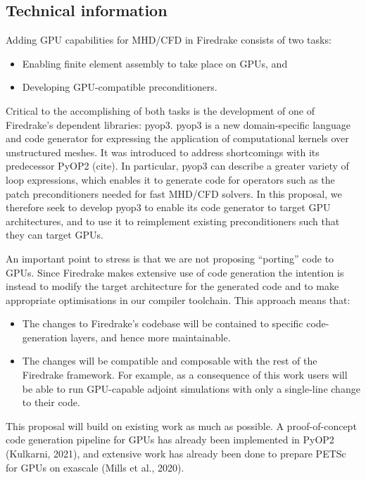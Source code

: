 \documentclass[a4paper,11pt]{article}
\begin{document}
\subsection{Technical information}
Adding GPU capabilities for MHD/CFD in Firedrake consists of two tasks: 
\begin{itemize}
	\item Enabling finite element assembly to take place on GPUs, and 
	\item Developing GPU-compatible preconditioners.
\end{itemize}
Critical to the accomplishing of both tasks is the development of one of Firedrake’s dependent libraries: pyop3. pyop3 is a new domain-specific language and code generator for expressing the application of computational kernels over unstructured meshes.
It was introduced to address shortcomings with its predecessor PyOP2 (cite).
In particular, pyop3 can describe a greater variety of loop expressions, which enables it to generate code for operators such as the patch preconditioners needed for fast MHD/CFD solvers.
In this proposal, we therefore seek to develop pyop3 to enable its code generator to target GPU architectures, and to use it to reimplement existing preconditioners such that they can target GPUs. 

An important point to stress is that we are not proposing ``porting'' code to GPUs.
Since Firedrake makes extensive use of code generation the intention is instead to modify the target architecture for the generated code and to make appropriate optimisations in our compiler toolchain.
This approach means that: 
\begin{itemize}
	\item The changes to Firedrake’s codebase will be contained to specific code-generation layers, and hence more maintainable.
	\item The changes will be compatible and composable with the rest of the Firedrake framework. For example, as a consequence of this work users will be able to run GPU-capable adjoint simulations with only a single-line change to their code.
\end{itemize}
This proposal will build on existing work as much as possible. A proof-of-concept code generation pipeline for GPUs has already been implemented in PyOP2 (Kulkarni, 2021), and extensive work has already been done to prepare PETSc for GPUs on exascale (Mills et al., 2020).
\end{document}
